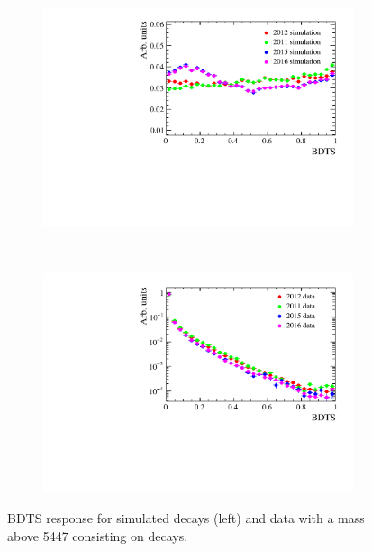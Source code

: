 \begin{figure}
    \centering
    \begin{subfigure}[b]{0.4\textwidth}
        \includegraphics[width=\textwidth]{./Figs/Selection/BDTS_signal_Feb6.pdf}
        \caption{ }
        \label{fig:BDTSsig}
    \end{subfigure}
    ~ %
    \begin{subfigure}[b]{0.4\textwidth}
       \includegraphics[width=\textwidth]{./Figs/Selection/BDTS_background_Feb6.pdf}
        \caption{ }
        \label{fig:BDTSbkg}
    \end{subfigure}
    \caption{BDTS response for simulated \bsmumu decays (left) and data with a mass above 5447 \mevcc consisting on \bbbarmumux decays.}
    \label{fig:FlatteningBDTS}
\end{figure}

